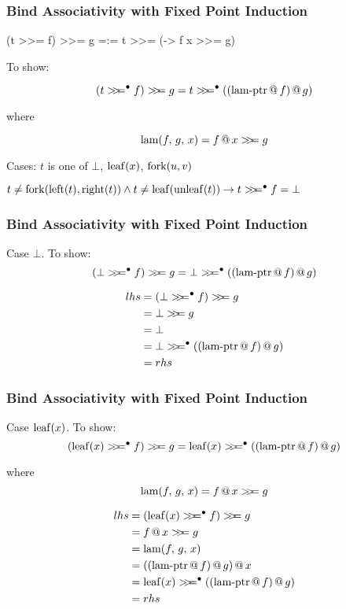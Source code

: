 \documentclass[serif,professionalfont]{beamer}
\begin{document}
\begin{frame}[fragile]
\frametitle{Bind Associativity with Fixed Point Induction}

\begin{code}
(t >>= f) >>= g =:= t >>= (\x -> f x >>= g)
\end{code}


To show:

$$\bind{(\bindb{t}{f})}{g} = \bindb{t}{\lamptr{f}{g}}$$

where

$$\mathrm{lam}(f, \, g, \, x) = f \, @ \, x >\!\!>\!\!= g$$

\pause

\vspace{2\baselineskip}

Cases: $t$ is one of $\bot$, $\mathrm{leaf}(x)$, $\mathrm{fork}(u,v)$
\pause

\vspace{2\baselineskip}

$t \neq \mathrm{fork}(\mathrm{left}(t),\mathrm{right}(t)) \wedge t \neq\mathrm{leaf}(\mathrm{unleaf}(t)) \rightarrow t >\!\!>\!\!=^{\bullet} f = \bot$

\end{frame}

\begin{frame}[fragile]
\frametitle{Bind Associativity with Fixed Point Induction}

Case $\bot$. To show:
$$\bind{(\bindb{\bot}{f})}{g} = \bindb{\bot}{\lamptr{f}{g}}$$

\begin{align*}
lhs = & \; \bind{(\bindb{\bot}{f})}{g} \\
    = & \; \bind{\bot}{g}              \\
    = & \; \bot                        \\
    = & \; \bindb{\bot}{\lamptr{f}{g}} \\
    = & \; rhs
\end{align*}

\end{frame}

\begin{frame}[fragile]
\frametitle{Bind Associativity with Fixed Point Induction}

Case $\mathrm{leaf}(x)$. To show:
$$\bind{(\bindb{\leaf{x}}{f})}{g} = \bindb{\leaf{x}}{\lamptr{f}{g}}$$

where
$$\mathrm{lam}(f, \, g, \, x) = f \, @ \, x >\!\!>\!\!= g$$

\begin{align*}
lhs = & \; \bind{(\bindb{\leaf{x}}{f})}{g} \\
    = & \; \bind{\app{f}{x}}{g}            \\
    = & \; \lam{f}{g}{x}              \\
    = & \; \app{\lamptr{f}{g}}{x}          \\
    = & \; \bindb{\leaf{x}}{\lamptr{f}{g}} \\
    = & \; rhs
\end{align*}

\end{frame}
\end{document}
